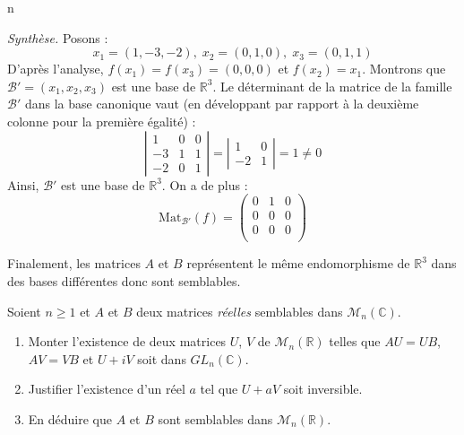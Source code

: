 n\documentclass[a4paper,10pt]{report}
\begin{document}
\noindent \textit{Synthèse.} Posons :
$$ x_1 =(1,-3,-2), \; x_2 = (0,1,0), \; x_3= (0,1,1)$$
D'après l'analyse, $f(x_1)=f(x_3)=(0,0,0)$ et $f(x_2)=x_1$. Montrons que $\mathcal{B}'=(x_1,x_2,x_3)$ est une base de $\mathbb{R}^3$. Le déterminant de la matrice de la famille $\mathcal{B}'$ dans la base canonique vaut (en développant par rapport à la deuxième colonne pour la première égalité) :
$$ \left\vert \begin{array}{ccc}
1 & 0 & 0 \\
-3 & 1 & 1 \\
-2 & 0 & 1 
\end{array}\right\vert =  \left\vert \begin{array}{cc} 1 & 0 \\
-2 & 1\end{array}\right\vert =1 \neq 0 $$
Ainsi, $\mathcal{B}'$ est une base de $\mathbb{R}^3$. On a de plus :
$$ \textrm{Mat}_{\mathcal{B}'}(f) = \begin{pmatrix}
0 & 1 & 0 \\
0 & 0 & 0 \\
0 & 0 & 0 \\
\end{pmatrix}$$

\medskip

\noindent Finalement, les matrices $A$ et $B$ représentent le même endomorphisme de $\mathbb{R}^3$ dans des bases différentes donc sont semblables.

\begin{Exercice}{} Soient $n \geq 1$ et $A$ et $B$ deux matrices \textit{réelles} semblables dans $\mathcal{M}_n(\mathbb{C})$.

\begin{enumerate}
\item Monter l'existence de deux matrices $U$, $V$ de $\mathcal{M}_n(\mathbb{R})$ telles que $AU=UB$, $AV=VB$ et $U+iV$ soit dans $GL_n(\mathbb{C})$.
\item Justifier l'existence d'un réel $a$ tel que $U+aV$ soit inversible.
\item En déduire que $A$ et $B$ sont semblables dans $\mathcal{M}_n(\mathbb{R})$.
\end{enumerate}
\end{Exercice} 
\end{document}
